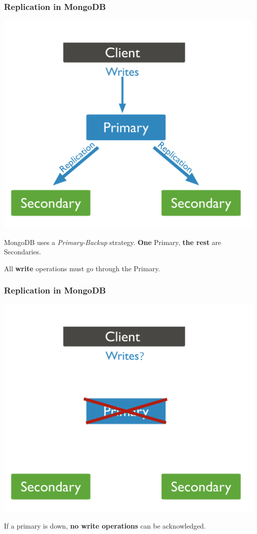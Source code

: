 \documentclass[numfooter,sectionpages,protectFrameTitle, progressbar, cblock, valigncolumns, addlogo]{beamer}
\begin{document}
\begin{frame}
    \frametitle{Replication in MongoDB}

    \centering
    \includegraphics[height=.625\textheight]{../images/mongodbreplicaset.png}

    MongoDB uses a \textit{Primary-Backup} strategy. \textbf{One} Primary, \textbf{the rest} are Secondaries.

    All \textbf{write} operations must go through the Primary.
\end{frame}

\begin{frame}
    \frametitle{Replication in MongoDB}
    
    \centering
    \includegraphics[height=.625\textheight]{../images/mongodbprimaryfail.png}

    If a primary is down, \textbf{no write operations} can be acknowledged.

\end{frame}
\end{document}
